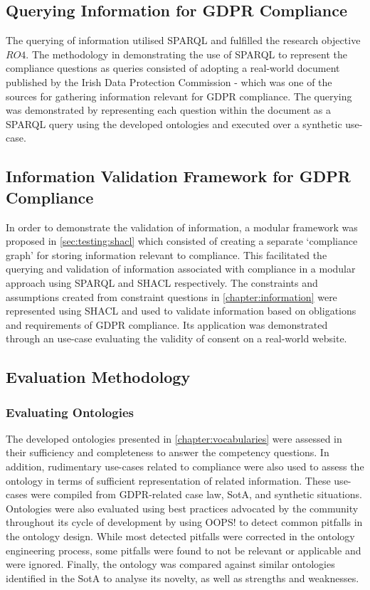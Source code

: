 \subsection{Querying Information for GDPR Compliance}
The querying of information utilised SPARQL and fulfilled the research objective $RO4$.
The methodology in demonstrating the use of SPARQL to represent the compliance questions as queries consisted of adopting a real-world document published by the Irish Data Protection Commission - which was one of the sources for gathering information relevant for GDPR compliance.
The querying was demonstrated by representing each question within the document as a SPARQL query using the developed ontologies and executed over a synthetic use-case.

\subsection{Information Validation Framework for GDPR Compliance}
In order to demonstrate the validation of information, a modular framework was proposed in \autoref{sec:testing:shacl} which consisted of creating a separate `compliance graph' for storing information relevant to compliance.
This facilitated the querying and validation of information associated with compliance in a modular approach using SPARQL and SHACL respectively.
The constraints and assumptions created from constraint questions in \autoref{chapter:information} were represented using SHACL and used to validate information based on obligations and requirements of GDPR compliance.
Its application was demonstrated through an use-case evaluating the validity of consent on a real-world website.

\subsection{Evaluation Methodology}\label{sec:intro:evaluation}
\subsubsection{Evaluating Ontologies}
The developed ontologies presented in \autoref{chapter:vocabularies} were assessed in their sufficiency and completeness to answer the competency questions. 
In addition, rudimentary use-cases related to compliance were also used to assess the ontology in terms of sufficient representation of related information. These use-cases were compiled from GDPR-related case law, SotA, and synthetic situations.
Ontologies were also evaluated using best practices advocated by the community throughout its cycle of development by using OOPS! \cite{poveda-villalon_oops!_2014} to detect common pitfalls in the ontology design.
While most detected pitfalls were corrected in the ontology engineering process, some pitfalls were found to not be relevant or applicable and were ignored.
Finally, the ontology was compared against similar ontologies identified in the SotA to analyse its novelty, as well as strengths and weaknesses.

